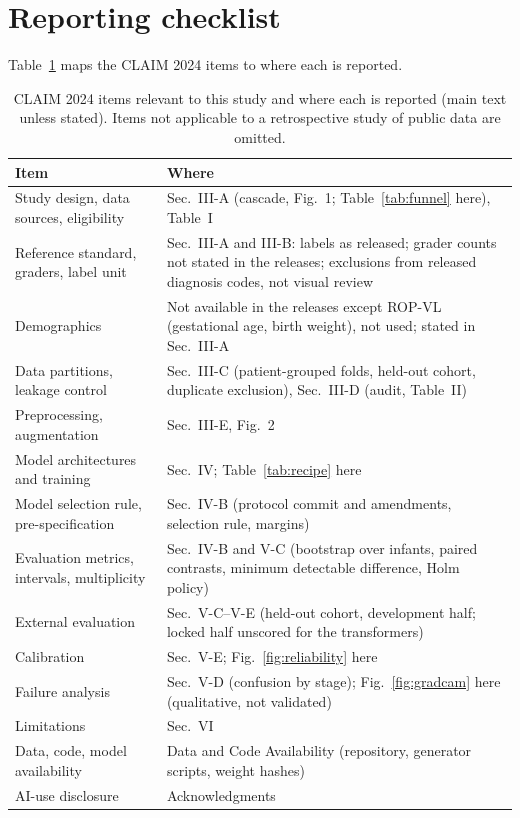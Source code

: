 \documentclass[journal]{IEEEtran}
\begin{document}
\section{Reporting checklist}
Table~\ref{tab:claim} maps the CLAIM 2024 items to where each is reported.
\begin{table}[!t]
\caption{CLAIM 2024 items relevant to this study and where each is reported (main text unless stated). Items not applicable to a retrospective study of public data are omitted.}
\label{tab:claim}
\centering\scriptsize\setlength{\tabcolsep}{4pt}
\begin{tabular}{@{}>{\raggedright\arraybackslash}p{5.2cm}>{\raggedright\arraybackslash}p{11cm}@{}}
\toprule
Item & Where \\
\midrule
Study design, data sources, eligibility & Sec.~III-A (cascade, Fig.~1; Table~\ref{tab:funnel} here), Table~I \\
Reference standard, graders, label unit & Sec.~III-A and III-B: labels as released; grader counts not stated in the releases; exclusions from released diagnosis codes, not visual review \\
Demographics & Not available in the releases except ROP-VL (gestational age, birth weight), not used; stated in Sec.~III-A \\
Data partitions, leakage control & Sec.~III-C (patient-grouped folds, held-out cohort, duplicate exclusion), Sec.~III-D (audit, Table~II) \\
Preprocessing, augmentation & Sec.~III-E, Fig.~2 \\
Model architectures and training & Sec.~IV; Table~\ref{tab:recipe} here \\
Model selection rule, pre-specification & Sec.~IV-B (protocol commit and amendments, selection rule, margins) \\
Evaluation metrics, intervals, multiplicity & Sec.~IV-B and V-C (bootstrap over infants, paired contrasts, minimum detectable difference, Holm policy) \\
External evaluation & Sec.~V-C--V-E (held-out cohort, development half; locked half unscored for the transformers) \\
Calibration & Sec.~V-E; Fig.~\ref{fig:reliability} here \\
Failure analysis & Sec.~V-D (confusion by stage); Fig.~\ref{fig:gradcam} here (qualitative, not validated) \\
Limitations & Sec.~VI \\
Data, code, model availability & Data and Code Availability (repository, generator scripts, weight hashes) \\
AI-use disclosure & Acknowledgments \\
\bottomrule
\end{tabular}
\end{table}
\end{document}
